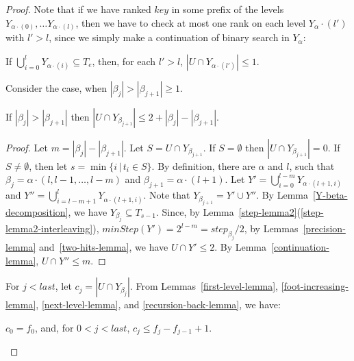 \documentclass{llncs}
\begin{document}
\begin{proof}
Note that if we have ranked $key$ in some prefix of the levels
$Y_{\alpha\cdot(0)},\ldots Y_{\alpha\cdot(l)}$, then
we have to check at most one rank on each level $Y_\alpha\cdot(l')$ with $l'>l$,
since we simply make a continuation of binary search in $Y_\alpha$:
\begin{lemma}\label{continuation-lemma}
If $\bigcup_{i=0}^l Y_{\alpha\cdot(i)}\subseteq T_e$, then,
for each $l'>l$,
$|U\cap Y_{\alpha\cdot(l')}|\le 1$.
\end{lemma}


Consider the case, when $|\beta_j|>|\beta_{j+1}|\ge 1$.
\begin{lemma}\label{recursion-back-lemma}
If $|\beta_{j}|>|\beta_{j+1}|$ 
then 
$|U \cap Y_{\beta_{j+1}}|\le 2+|\beta_{j}|-|\beta_{j+1}|$.
\end{lemma}

\begin{proof}
Let $m=|\beta_{j}|-|\beta_{j+1}|$.
Let  $S=U\cap Y_{\beta_{j+1}}$.
If $S=\emptyset$ then $|U\cap Y_{\beta_{j+1}}|=0$.
If $S\not=\emptyset$, then let $s=\min\{i\,|\, t_i\in S\}$.
By definition, there are $\alpha$ and $l$, such that
$\beta_j=\alpha\cdot (l,l-1,\ldots, l-m)$ and
$\beta_{j+1}=\alpha\cdot (l+1)$.
Let $Y'=\bigcup_{i=0}^{l-m} Y_{\alpha\cdot(l+1,i)}$ and
$Y''=\bigcup_{i=l-m+1}^l Y_{\alpha\cdot(l+1,i)}$.
Note that $Y_{\beta_{j+1}}=Y'\cup Y''$.
By Lemma~\ref{Y-beta-decomposition}, we have $Y_{\beta_j}\subseteq T_{s-1}$.
Since,
by Lemma~\ref{step-lemma2}(\ref{step-lemma2-interleaving}),
$minStep(Y')=2^{l-m}=step_{\beta_j}/2$, by Lemmas~\ref{precision-lemma} and~\ref{two-hits-lemma},
we have 
$U\cap Y'\le 2$.
By Lemma~\ref{continuation-lemma}, 
$U\cap Y''\le m$.
\end{proof}


For $j<last$, let $c_j= | U\cap Y_{\beta_j}|$.
From Lemmas~\ref{first-level-lemma}, \ref{foot-increasing-lemma}, \ref{next-level-lemma}, and \ref{recursion-back-lemma},
we have:
\begin{lemma}\label{cost-foot-lemma}
$c_0=f_0$, and,
for $0< j<last$, $c_j\le f_j-f_{j-1}+1$.
\end{lemma}


\end{proof}
\end{document}
